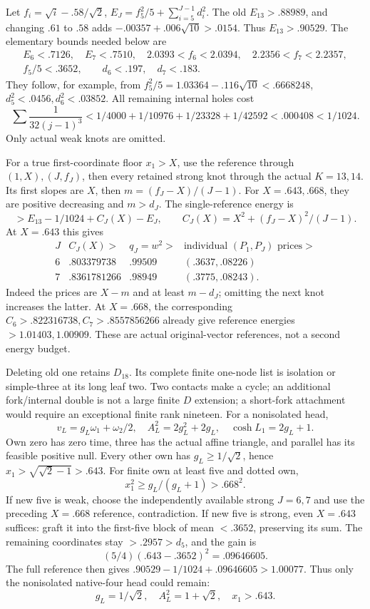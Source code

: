 \documentclass[11pt]{article}
\theoremstyle{definition}
\theoremstyle{remark}
\begin{document}
Let \(f_i=\sqrt i-.58/\sqrt2\),
\(E_J=f_5^2/5+\sum_{i=5}^{J-1}d_i^2\).
The old \(E_{13}>.88989\), and
changing \(.61\) to \(.58\)
adds \(-.00357+.006\sqrt{10}>.0154\).
Thus \(E_{13}>.90529\).
The elementary bounds needed below
are
\[
\begin{gathered}
 E_6<.7126,\quad E_7<.7510,\quad
 2.0393<f_6<2.0394,\quad2.2356<f_7<2.2357,\\
 f_5/5<.3652,\qquad d_6<.197,\quad d_7<.183 .
\end{gathered}
\]
They follow, for example, from
\(f_5^2/5=1.03364-.116\sqrt{10}<.6668248\),
\(d_5^2<.0456,d_6^2<.03852\).
All remaining internal holes cost
\[
 \sum\frac1{32(j-1)^3}
 <1/4000+1/10976+1/23328+1/42592
                               <.000408<1/1024 .
\]
Only actual weak knots are omitted.

For a true first-coordinate floor
\(x_1>X\), use the reference
through \((1,X),(J,f_J)\), then
every retained strong knot through
the actual \(K=13,14\).
Its first slopes are \(X\),
then \(m=(f_J-X)/(J-1)\).
For \(X=.643,.668\), they are
positive decreasing and \(m>d_J\).
The single-reference energy is
\[
                       >E_{13}-1/1024+C_J(X)-E_J,
             \qquad C_J(X)=X^2+(f_J-X)^2/(J-1).
\]
At \(X=.643\) this gives
\[
\begin{array}{c|c|c|c}
 J&C_J(X)>&q_J=w^2>&\text{individual }(P_1,P_J)\text{ prices}>\\ \hline
 6&.803379738&.99509&(.3637,.08226)\\
 7&.8361781266&.98949&(.3775,.08243).
\end{array}
\tag{D19headrefs}\label{app:exact19:eq:Dheadrefs}
\]
Indeed the prices are \(X-m\)
and at least \(m-d_J\);
omitting the next knot increases
the latter.
At \(X=.668\), the corresponding
\(C_6>.822316738,C_7>.8557856266\)
already give reference energies
\(>1.01403,1.00909\).
These are actual original-vector
references, not a second energy
budget.

Deleting old one retains \(D_{18}\).
Its complete finite one-node list
is isolation or simple-three at
its long leaf two.
Two contacts make a cycle;
an additional fork/internal double
is not a large finite \(D\)
extension; a short-fork attachment
would require an exceptional
finite rank nineteen.
For a nonisolated head,
\[
 v_L=g_L\omega_1+\omega_2/2,\quad
 A_L^2=2g_L^2+2g_L,\quad
                   \cosh L_1=2g_L+1 .
\]
Own zero has zero time, three
has the actual affine triangle,
and parallel has its feasible
positive null.
Every other own has
\(g_L\ge1/\sqrt2\), hence
\(x_1>\sqrt{\sqrt2-1}>.643\).
For finite own at least five
and dotted own,
\[
                     x_1^2\ge g_L/(g_L+1)>.668^2 .
\]
If new five is weak, choose the
independently available strong
\(J=6,7\) and use the preceding
\(X=.668\) reference, contradiction.
If new five is strong, even
\(X=.643\) suffices: graft it
into the first-five block of mean
\(<.3652\), preserving its sum.
The remaining coordinates stay
\(>.2957>d_5\), and the gain is
\[
                       (5/4)(.643-.3652)^2=.09646605 .
\]
The full reference then gives
\(.90529-1/1024+.09646605>1.00077\).
Thus only the nonisolated native-four
head could remain:
\[
                  g_L=1/\sqrt2,\quad A_L^2=1+\sqrt2,\quad x_1>.643 .
\]
\end{document}
